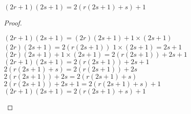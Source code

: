 \begin{theorem}
\label{thm:arith}
$(2r+1)(2s+1) = 2(r(2s+1)+s) + 1$
\end{theorem}
\begin{proof}\leavevmode

\begin{formalproof}
\State \label{p2:1}$(2r+1)(2s+1) = (2r)(2s+1) + 1 \times (2s+1)$
\State \label{p2:2a}$(2r)(2s+1) = 2(r(2s+1))$
\State \label{p2:2b}$1 \times (2s+1) = 2s + 1$
\State \label{p2:3}$(2r)(2s+1) + 1 \times (2s+1) = 2(r(2s+1)) + 2s + 1$
\State \label{p2:4}$(2r+1)(2s+1) = 2(r(2s+1)) + 2s + 1$
\State \label{p2:5a}$2(r(2s+1) + s) = 2(r(2s+1)) + 2s$
\State \label{p2:5b}$2(r(2s+1)) + 2s = 2(r(2s+1) + s)$
\State \label{p2:5c}$2(r(2s+1)) + 2s + 1 = 2(r(2s+1) + s) + 1$
\State \label{p2:6}$(2r+1)(2s+1) = 2(r(2s+1) + s) + 1$
\end{formalproof}

\end{proof}



